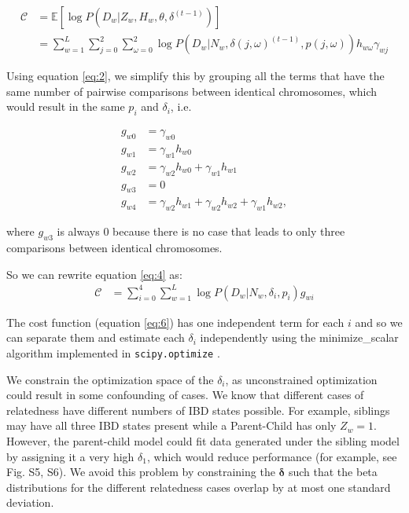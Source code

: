 \documentclass[12pt, letterpaper]{article}
\begin{document}
\begin{align}\label{eq:4}
\mathcal{C} &= \mathbb{E}[\log P(D_w|Z_w, H_w, \theta, \delta^{(t-1)})]\nonumber\\
&= \sum_{w=1}^L \sum_{j=0}^2\sum^2_{\omega=0} \log P(D_{w}|N_w, \delta(j ,\omega)^{(t-1)}, p(j,\omega))h_{w\omega}\gamma_{wj}
\end{align}


Using equation \ref{eq:2}, we simplify this by grouping all the terms that have the same number of pairwise comparisons between identical chromosomes, which would result in the same $p_i$ and $\delta_i$, i.e.

\begin{align}\label{eq:5}
g_{w0} &= \gamma_{w0}\nonumber\\
g_{w1} &= \gamma_{w1} h_{w0}\nonumber\\
g_{w2} &= \gamma_{w2} h_{w0} + \gamma_{w1} h_{w1}\nonumber\\
g_{w3} &= 0 \nonumber\\
g_{w4} &= \gamma_{w2} h_{w1} + \gamma_{w2} h_{w2} + \gamma_{w1} h_{w2},
\end{align}

where $g_{w3}$ is always 0 because there is no case that leads to only three comparisons between identical chromosomes.

So we can rewrite equation \ref{eq:4} as:
\begin{align}\label{eq:6}
\mathcal{C} &= \sum_{i=0}^4 \sum_{w=1}^L \log P(D_{w}|N_w, \delta_i, p_i)g_{wi}
\end{align}

The cost function (equation \ref{eq:6}) has one independent term for each $i$ and so we can separate them and estimate each $\delta_i$ independently using the minimize\_scalar algorithm implemented in \texttt{scipy.optimize} \cite{virtanen_scipy_2020}.


We constrain the optimization space of the $\delta_i$, as unconstrained optimization could result in some confounding of cases. We know that different cases of relatedness have different numbers of IBD states possible. For example, siblings may have all three IBD states present while a Parent-Child has only $Z_w=1$. However, the parent-child model could fit data generated under the sibling model by assigning it a very high $\delta_1$, which would reduce performance (for example, see Fig. S5, S6). We avoid this problem by constraining the $\bm{\delta}$ such that the beta distributions for the different relatedness cases overlap by at most one standard deviation.
\end{document}

